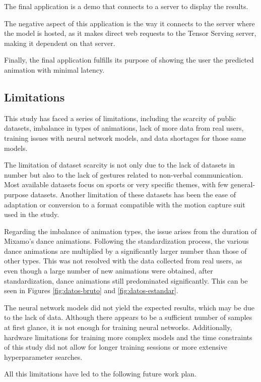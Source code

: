 The final application is a demo that connects to a server to display the results.

The negative aspect of this application is the way it connects to the server where the model is hosted, as it makes direct web requests to the Tensor Serving server, making it dependent on that server.

Finally, the final application fulfills its purpose of showing the user the predicted animation with minimal latency.


\subsection{Limitations}


This study has faced a series of limitations, including the scarcity of public datasets, imbalance in types of animations, lack of more data from real users, training issues with neural network models, and data shortages for those same models.

The limitation of dataset scarcity is not only due to the lack of datasets in number but also to the lack of gestures related to non-verbal communication. Most available datasets focus on sports or very specific themes, with few general-purpose datasets. Another limitation of these datasets has been the ease of adaptation or conversion to a format compatible with the motion capture suit used in the study.

Regarding the imbalance of animation types, the issue arises from the duration of Mixamo's dance animations. Following the standardization process, the various dance animations are multiplied by a significantly larger number than those of other types. This was not resolved with the data collected from real users, as even though a large number of new animations were obtained, after standardization, dance animations still predominated significantly. This can be seen in Figures \ref{fig:datos-bruto} and \ref{fig:datos-estandar}.

The neural network models did not yield the expected results, which may be due to the lack of data. Although there appears to be a sufficient number of samples at first glance, it is not enough for training neural networks. Additionally, hardware limitations for training more complex models and the time constraints of this study did not allow for longer training sessions or more extensive hyperparameter searches.

All this limitations have led to the following future work plan.


